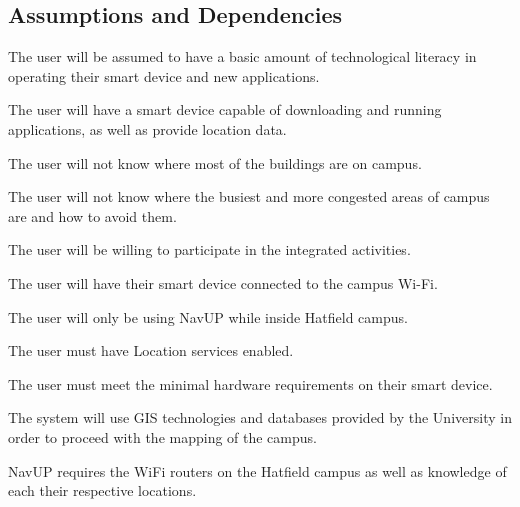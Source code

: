 \documentclass[12pt,a4paper]{article}
\begin{document}
	\subsection{Assumptions and Dependencies}
		\begin{AssumptionsEnum}
			\item The user will be assumed to have a basic amount of technological literacy in operating their smart device and new applications.
			\item The user will have a smart device capable of downloading and running applications, as well as provide location data.
			\item The user will not know where most of the buildings are on campus.
			\item The user will not know where the busiest and more congested areas of campus are and how to avoid them.
			\item The user will be willing to participate in the integrated activities.
		\end{AssumptionsEnum}
		\begin{DependenciesEnum}
			\item The user will have their smart device connected to the campus Wi-Fi.
			\item The user will only be using NavUP while inside Hatfield campus.
			\item The user must have Location services enabled.
			\item The user must meet the minimal hardware requirements on their smart device.
			\item The system will use GIS technologies and databases provided by the University in order to proceed with the mapping of the campus.
			\item NavUP requires the WiFi routers on the Hatfield campus as well as knowledge of each their respective locations.
		\end{DependenciesEnum}
\end{document}
